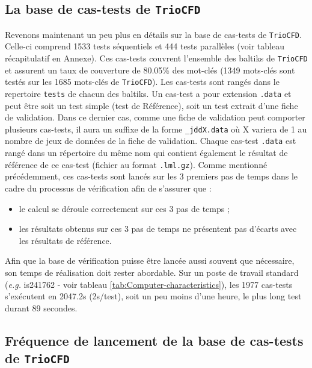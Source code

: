 \subsection{La base de cas-tests de \texttt{TrioCFD}}

Revenons maintenant un peu plus en d\'etails sur la base de cas-tests de \texttt{TrioCFD}. Celle-ci comprend 1533 tests s\'equentiels et 444 tests parall\`eles (voir tableau r\'ecapitulatif en Annexe). Ces cas-tests couvrent l'ensemble des baltiks de \texttt{TrioCFD} et assurent un taux de couverture de 80.05\% des mot-cl\'es (1349 mots-cl\'es sont test\'es sur les 1685 mots-cl\'es de \texttt{TrioCFD}). Les cas-tests sont rang\'es dans le repertoire \texttt{tests} de chacun des baltiks. Un cas-test a pour extension \texttt{.data} et peut \^etre soit un test simple (test de R\'ef\'erence), soit un test extrait d'une fiche de validation. Dans ce dernier cas, comme une fiche de validation peut comporter plusieurs cas-tests, il aura un suffixe de la forme \texttt{\_jddX.data} o\`u X variera de 1 au nombre de jeux de donn\'ees de la fiche de validation.\newline
Chaque cas-test \texttt{.data} est rang\'e dans un r\'epertoire du m\^eme nom qui contient \'egalement le r\'esultat de r\'ef\'erence de ce cas-test (fichier au format \texttt{.lml.gz}). Comme mentionn\'e pr\'ec\'edemment, ces cas-tests sont lanc\'es sur les 3 premiers pas de temps dans le cadre du processus de v\'erification afin de s'assurer que :
\begin{itemize}[label=$\Rightarrow$, font=\LARGE]
  \item le calcul se d\'eroule correctement sur ces 3 pas de temps ;
  \item les r\'esultats obtenus sur ces 3 pas de temps ne pr\'esentent pas d'\'ecarts avec les r\'esultats de   r\'ef\'erence.
\end{itemize}
Afin que la base de v\'erification puisse \^etre lanc\'ee aussi souvent que n\'ecessaire, son temps de r\'ealisation doit rester abordable. Sur un poste de travail standard (\textit{e.g.} is241762 - voir tableau \ref{tab:Computer-characteristics}), les 1977 cas-tests s'exécutent en 2047.2s (2s/test), soit un peu moins d'une heure, le plus long test durant 89 secondes.


\subsection{Fréquence de lancement de la base de cas-tests de \texttt{TrioCFD}}

